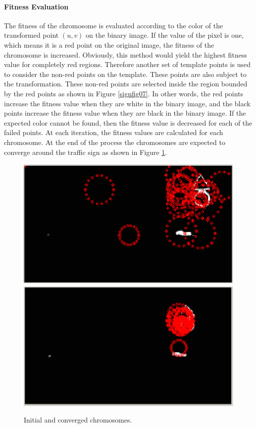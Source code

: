 \documentclass[review,number]{elsarticle}
\begin{document}
\paragraph{Fitness Evaluation}
The fitness of the chromosome is evaluated according to the color of the transformed point $(u,v)$ on the binary image. If the value of the pixel is one, which means it is a red point on the original image, the fitness of the chromosome is increased. Obviously, this method would yield the highest fitness value for completely red regions. Therefore another set of template points is used to consider the non-red points on the template. These points are also subject to the transformation. These non-red points are selected inside the region bounded by the red points as shown in Figure \ref{signfig07}. In other words, the red points increase the fitness value when they are white in the binary image, and the black points increase the fitness value when they are black in the binary image. If the expected color cannot be found, then the fitness value is decreased for each of the failed points. At each iteration, the fitness values are calculated for each chromosome. At the end of the process the chromosomes are expected to converge around the traffic sign as shown in Figure \ref{signfig09}.
\begin{figure}[H]
\begin{center}
\includegraphics[scale=0.5]{img/signfig08.eps}
\includegraphics[scale=0.5]{img/signfig09.eps}
\caption{Initial and converged chromosomes.}
\label{signfig09}
\end{center}
\end{figure}
\end{document}
